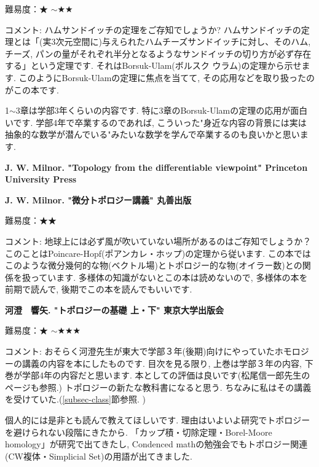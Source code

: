 難易度：★ $\sim$★★\vspace{-6pt} 

コメント: ハムサンドイッチの定理をご存知でしょうか? ハムサンドイッチの定理とは「(実3次元空間に)与えられたハムチーズサンドイッチに対し、そのハム, チーズ, パンの量がそれぞれ半分となるようなサンドイッチの切り方が必ず存在する」という定理です. それはBorsuk-Ulam(ボルスク ウラム)の定理から示せます. 
このようにBorsuk-Ulamの定理に焦点を当てて, その応用などを取り扱ったのがこの本です. 

1$\sim$3章は学部3年くらいの内容です. 特に3章のBorsuk-Ulamの定理の応用が面白いです. 学部4年で卒業するのであれば, こういった"身近な内容の背景には実は抽象的な数学が潜んでいる"みたいな数学を学んで卒業するのも良いかと思います. 
\vspace{8pt}

\textbf{J. W. Milnor. "Topology from the differentiable viewpoint" Princeton University Press}  　\vspace{-6pt} 

\textbf{J. W. Milnor. "微分トポロジー講義" 丸善出版}  　\vspace{-6pt} 

難易度：★★ \vspace{-6pt} 

コメント: 地球上には必ず風が吹いていない場所があるのはご存知でしょうか？ このことはPoincare-Hopf(ポアンカレ・ホップ)の定理から従います. この本ではこのような微分幾何的な物(ベクトル場)とトポロジー的な物(オイラー数)との関係を扱っています. 多様体の知識がないとこの本は読めないので, 多様体の本を前期で読んで, 後期でこの本を読んでもいいです. 
\vspace{8pt}


\textbf{河澄　響矢. "トポロジーの基礎 上・下" 東京大学出版会}  　\vspace{-6pt} 

難易度：★ $\sim$★★★\vspace{-6pt} 

コメント: おそらく河澄先生が東大で学部３年(後期)向けにやっていたホモロジーの講義の内容を本にしたものです. 目次を見る限り, 上巻は学部３年の内容, 下巻が学部4年の内容だと思います. 本としての評価は良いです(松尾信一郎先生のページも参照.) トポロジーの新たな教科書になると思う. ちなみに私はその講義を受けていた.(\ref{subsec-class}節参照. )

個人的には是非とも読んで教えてほしいです. 理由はいよいよ研究でトポロジーを避けられない段階にきたから. 「カップ積・切除定理・Borel-Moore homology」が研究で出てきたし, Condenced mathの勉強会でもトポロジー関連(CW複体・Simplicial Set)の用語が出てきました. 
\vspace{8pt}

